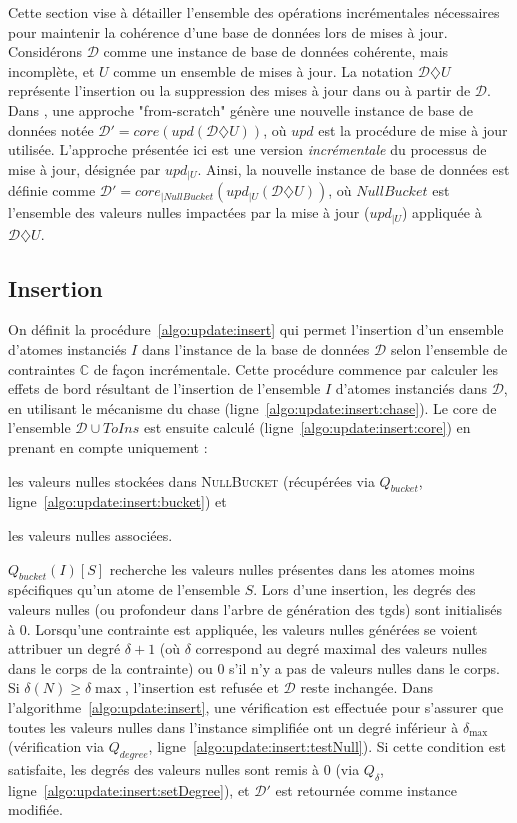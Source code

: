 Cette section vise à détailler l'ensemble des opérations incrémentales nécessaires pour maintenir la cohérence d'une base de données lors de mises à jour.
Considérons $\mathcal{D}$ comme une instance de base de données cohérente, mais incomplète, et $U$ comme un ensemble de mises à jour.
La notation $\mathcal{D} \diamondsuit U$ représente l'insertion ou la suppression des mises à jour dans ou à partir de $\mathcal{D}$.
Dans \cite{chabinConsistentUpdatingDatabases2020}, une approche "from-scratch" génère une nouvelle instance de base de données notée $\mathcal{D}' = core(upd(\mathcal{D} \diamondsuit U))$, où $upd$ est la procédure de mise à jour utilisée.
L'approche présentée ici est une version \textit{incrémentale} du processus de mise à jour, désignée par $upd_{|U}$.
Ainsi, la nouvelle instance de base de données est définie comme $\mathcal{D}' = core_{|NullBucket}(upd_{|U}(\mathcal{D}\diamondsuit U))$, où $NullBucket$ est l'ensemble des valeurs nulles impactées par la mise à jour ($upd_{|U}$) appliquée à $\mathcal{D} \diamondsuit U$.

\subsection{Insertion}
\label{sec:update:insert}
On définit la procédure~\ref{algo:update:insert} qui permet l'insertion d'un ensemble d'atomes instanciés $I$ dans l'instance de la base de données $\mathcal{D}$ selon l'ensemble de contraintes $\mathbb{C}$ de façon incrémentale.
Cette procédure commence par calculer les effets de bord résultant de l'insertion de l'ensemble $I$ d'atomes instanciés dans $\mathcal{D}$, en utilisant le mécanisme du \gls{chase} (ligne~\ref{algo:update:insert:chase}).
Le \gls{core} de l'ensemble $\mathcal{D} \cup ToIns$ est ensuite calculé (ligne~\ref{algo:update:insert:core}) en prenant en compte uniquement :
\begin{enumerate*}[label=(\alph*)]
    \item les valeurs nulles stockées dans \textsc{NullBucket} (récupérées via $Q_{bucket}$, ligne~\ref{algo:update:insert:bucket}) et
    \item les valeurs nulles associées.
\end{enumerate*}
$Q_{bucket}(I){[S]}$ recherche les valeurs nulles présentes dans les atomes moins spécifiques qu'un atome de l'ensemble $S$.
Lors d'une insertion, les degrés des valeurs nulles (ou profondeur dans l'arbre de génération des \glspl{tgd}) sont initialisés à 0.
Lorsqu'une contrainte est appliquée, les valeurs nulles générées se voient attribuer un degré $\delta + 1$ (où $\delta$ correspond au degré maximal des valeurs nulles dans le corps de la contrainte) ou 0 s'il n'y a pas de valeurs nulles dans le corps.
Si $\delta(N) \geq \delta{\max}$, l'insertion est refusée et $\mathcal{D}$ reste inchangée.
Dans l'algorithme~\ref{algo:update:insert}, une vérification est effectuée pour s'assurer que toutes les valeurs nulles dans l'instance simplifiée ont un degré inférieur à $\delta_{\max}$ (vérification via $Q_{degree}$, ligne~\ref{algo:update:insert:testNull}).
Si cette condition est satisfaite, les degrés des valeurs nulles sont remis à 0 (via $Q_{\delta}$, ligne~\ref{algo:update:insert:setDegree}), et $\mathcal{D}'$ est retournée comme instance modifiée.

